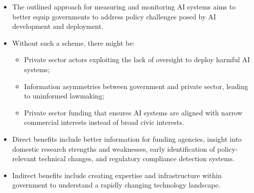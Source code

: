 \documentclass{article}
\begin{document}
\begin{multicols}{2}
\begin{itemize}
\item The outlined approach for measuring and monitoring AI systems aims to better equip governments to address policy challenges posed by AI development and deployment.
\item Without such a scheme, there might be:
    \begin{itemize}
        \item Private sector actors exploiting the lack of oversight to deploy harmful AI systems;
        \item Information asymmetries between government and private sector, leading to uninformed lawmaking;
        \item Private sector funding that ensures AI systems are aligned with narrow commercial interests instead of broad civic interests.
    \end{itemize}
\item Direct benefits include better information for funding agencies, insight into domestic research strengths and weaknesses, early identification of policy-relevant technical changes, and regulatory compliance detection systems.
\item Indirect benefits include creating expertise and infrastructure within government to understand a rapidly changing technology landscape.
\end{itemize}

\end{multicols}
\end{document}
